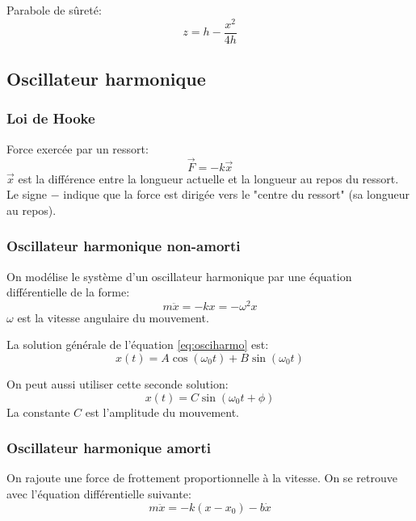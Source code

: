 \documentclass{article}
\numberwithin{equation}{section}
\begin{document}
Parabole de sûreté:
\begin{equation}
	\boxed{z = h - \dfrac{x^2}{4h}}
\end{equation}


\subsection{Oscillateur harmonique}
\subsubsection{Loi de Hooke}
Force exercée par un ressort:
\begin{equation}
	\boxed{\vec F = - k \vec x}
\end{equation}
\(\vec x\) est la différence entre la longueur actuelle et la longueur au repos du ressort. Le signe \(-\) indique que la force est dirigée vers le "centre du ressort" (sa longueur au repos).

\subsubsection{Oscillateur harmonique non-amorti}
On modélise le système d'un oscillateur harmonique par une équation différentielle de la forme:
\begin{equation} \label{eq:osciharmo}
	\boxed{ m \ddot x = - kx = - \omega^2 x }
\end{equation}
\(\omega\) est la vitesse angulaire du mouvement.

La solution générale de l'équation \ref{eq:osciharmo} est:
\begin{equation}
	\boxed{ x(t) = A \cos(\omega_0 t) + B \sin(\omega_0 t) }
\end{equation}

On peut aussi utiliser cette seconde solution:
\begin{equation}
	\boxed{ x(t) = C \sin(\omega_0 t + \phi) }
\end{equation}
La constante \(C\) est l'amplitude du mouvement.

\subsubsection{Oscillateur harmonique amorti}
On rajoute une force de frottement proportionnelle à la vitesse. On se retrouve avec l'équation différentielle suivante:
\begin{equation}
	\boxed{ m \ddot x = - k(x - x_0) - b \dot x }
\end{equation}
\end{document}
